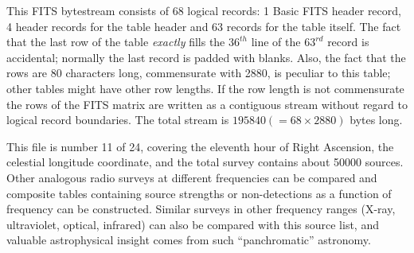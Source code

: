 This FITS bytestream consists of 68 logical records: 1 Basic FITS
header record, 4 header records for the table header and 63 records
for the table itself. The fact that the last row of the table {\em
exactly} fills the $36^{th}$ line of the $63^{rd}$ record is
accidental; normally the last record is padded with blanks. Also, the
fact that the rows are 80 characters long, commensurate with 2880, is
peculiar to this table; other tables might have other row lengths.  If
the row length is not commensurate the rows of the FITS matrix are
written as a contiguous stream without regard to logical record
boundaries.  The total stream is $195840 (=68\times 2880)$ bytes long.

This file is number 11 of 24, covering the eleventh hour of Right
Ascension, the celestial longitude coordinate, and the total survey
contains about 50000 sources.  Other analogous radio surveys at
different frequencies can be compared and composite tables containing
source strengths or non-detections as a function of frequency can be
constructed.  Similar surveys in other frequency ranges (X-ray,
ultraviolet, optical, infrared) can also be compared with this source
list, and valuable astrophysical insight comes from such
``panchromatic'' astronomy.

